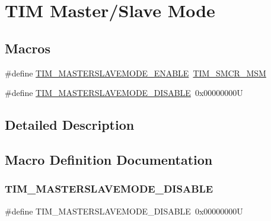 \hypertarget{group___t_i_m___master___slave___mode}{}\section{T\+IM Master/\+Slave Mode}
\label{group___t_i_m___master___slave___mode}
\subsection*{Macros}
\begin{DoxyCompactItemize}
\item 
\#define \hyperlink{group___t_i_m___master___slave___mode_gafdc0de07db4688aa8c87cf03220aaf28}{T\+I\+M\+\_\+\+M\+A\+S\+T\+E\+R\+S\+L\+A\+V\+E\+M\+O\+D\+E\+\_\+\+E\+N\+A\+B\+LE}~\hyperlink{group___peripheral___registers___bits___definition_ga52101db4ca2c7b3003f1b16a49b2032c}{T\+I\+M\+\_\+\+S\+M\+C\+R\+\_\+\+M\+SM}
\item 
\#define \hyperlink{group___t_i_m___master___slave___mode_ga58ff99ef1d6d6f187e3615f9d3ec3b8b}{T\+I\+M\+\_\+\+M\+A\+S\+T\+E\+R\+S\+L\+A\+V\+E\+M\+O\+D\+E\+\_\+\+D\+I\+S\+A\+B\+LE}~0x00000000U
\end{DoxyCompactItemize}


\subsection{Detailed Description}


\subsection{Macro Definition Documentation}
\mbox{\label{group___t_i_m___master___slave___mode_ga58ff99ef1d6d6f187e3615f9d3ec3b8b}} 
\subsubsection{\texorpdfstring{T\+I\+M\+\_\+\+M\+A\+S\+T\+E\+R\+S\+L\+A\+V\+E\+M\+O\+D\+E\+\_\+\+D\+I\+S\+A\+B\+LE}{TIM\_MASTERSLAVEMODE\_DISABLE}}
{\footnotesize\ttfamily \#define T\+I\+M\+\_\+\+M\+A\+S\+T\+E\+R\+S\+L\+A\+V\+E\+M\+O\+D\+E\+\_\+\+D\+I\+S\+A\+B\+LE~0x00000000U}


